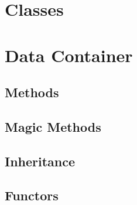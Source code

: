 \chapter{Classes}
\label{chp:Classes}
\chapter{Data Container}
\section{Methods}
\section{Magic Methods}
\section{Inheritance}
\section{Functors}
